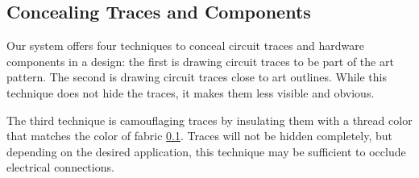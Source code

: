 \documentclass[header.tex]{subfiles}
\begin{document}



 

\subsection{Concealing Traces and Components}
Our system offers four techniques to conceal circuit traces and hardware components in a design: the first is drawing circuit traces to be part of the art pattern. The second is drawing circuit traces close to art outlines. 
While this technique does not hide the traces, it makes them less visible and obvious. 

The third technique is camouflaging traces by insulating them with a thread color that matches the color of fabric \ref{}. Traces will not be hidden completely, but depending on the desired application, this technique may be sufficient to occlude electrical connections. 
\end{document}
